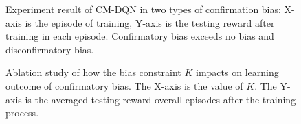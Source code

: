 \documentclass[10pt,letterpaper]{article}
\begin{document}
\begin{figure}[tp]
\label{figure 3:experiment result}
\begin{center}
\end{center}
\caption{Experiment result of CM-DQN in two types of confirmation bias: X-axis is the episode of training, Y-axis is the testing reward after training in each episode. Confirmatory bias exceeds no bias and disconfirmatory bias.} 
\end{figure}


\begin{figure}[tp]
\begin{center}
\end{center}
\caption{Ablation study of how the bias constraint $K$ impacts on learning outcome of confirmatory bias. The X-axis is the value of $K$. The Y-axis is the averaged testing reward overall episodes after the training process.} 
\label{ablation study}
\end{figure}
\end{document}
